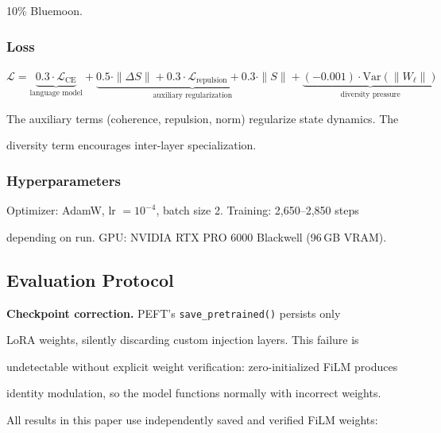 \documentclass[11pt,a4paper]{article}
\begin{document}
10\% Bluemoon.



\subsubsection*{Loss}



$\mathcal{L} = \underbrace{0.3\cdot\mathcal{L}_\mathrm{CE}}_\text{language model} + \underbrace{0.5\cdot\|\Delta S\| + 0.3\cdot\mathcal{L}_\mathrm{repulsion} + 0.3\cdot\|S\|}_\text{auxiliary regularization} + \underbrace{(-0.001)\cdot\mathrm{Var}(\|W_\ell\|)}_\text{diversity pressure}$



The auxiliary terms (coherence, repulsion, norm) regularize state dynamics. The

diversity term encourages inter-layer specialization.



\subsubsection*{Hyperparameters}



Optimizer: AdamW, lr $= 10^{-4}$, batch size 2. Training: 2,650--2,850 steps

depending on run. GPU: NVIDIA RTX PRO 6000 Blackwell (96\,GB VRAM).



\subsection{Evaluation Protocol}

\label{sec:protocol}



\textbf{Checkpoint correction.} PEFT's \texttt{save\_pretrained()} persists only

LoRA weights, silently discarding custom injection layers. This failure is

undetectable without explicit weight verification: zero-initialized FiLM produces

identity modulation, so the model functions normally with incorrect weights.



All results in this paper use independently saved and verified FiLM weights:
\end{document}
